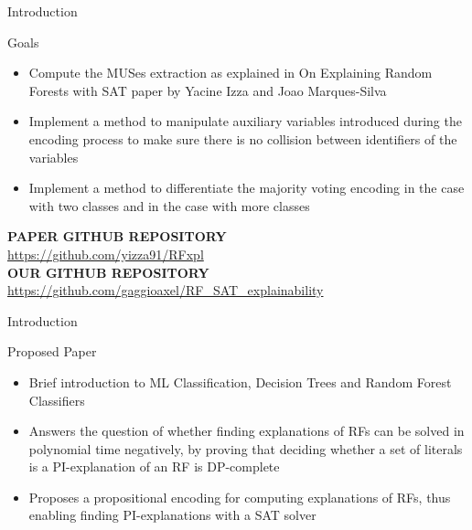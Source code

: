 \begin{frame}{Introduction}
    \begin{block}{Goals}
        \begin{itemize}
            \item Compute the MUSes extraction as explained in On Explaining Random Forests with SAT paper by Yacine Izza and Joao Marques-Silva
            \item Implement a method to manipulate auxiliary variables introduced during the encoding process to make sure there is no collision between identifiers of the variables
            \item Implement a method to differentiate the majority voting encoding in the case with two classes and in the case with more classes
        \end{itemize}
    \end{block}
    \vfill
    \begin{center}
        \fontsize{7}{10}\selectfont
        \textbf{PAPER GITHUB REPOSITORY}\\
        \url{https://github.com/yizza91/RFxpl}\\
        \vspace{1em}
        \textbf{OUR GITHUB REPOSITORY}\\
        \url{https://github.com/gaggioaxel/RF_SAT_explainability}
    \end{center}
\end{frame}

\begin{frame}{Introduction}
    \begin{block}{Proposed Paper}
        \begin{itemize}
            \item Brief introduction to ML Classification, Decision Trees and Random Forest Classifiers
            \item Answers the question of whether finding explanations of RFs can be solved in polynomial time negatively, by proving that deciding whether a set of literals is a PI-explanation of an RF is DP-complete
            \item Proposes a propositional encoding for computing explanations of RFs, thus enabling finding PI-explanations with a SAT solver
        \end{itemize}
    \end{block}
\end{frame}

